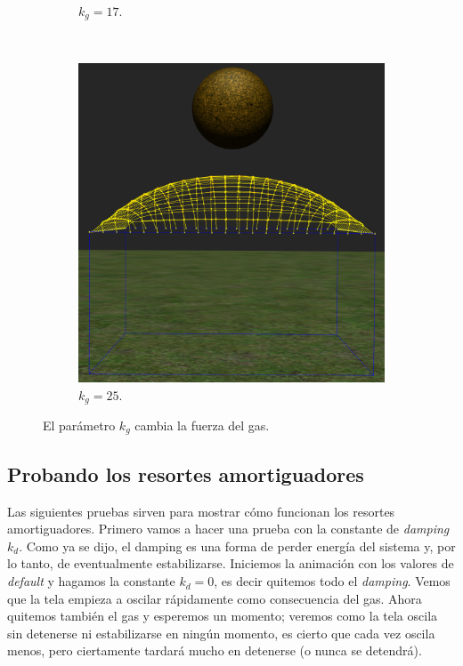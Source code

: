 \begin{figure}
\begin{subfigure}[b]{0.30\textwidth}
    \caption{$k_g=17$.}
  \end{subfigure}
~
  \begin{subfigure}[b]{0.30\textwidth}
    \includegraphics[width=\textwidth]{img/04/varPress3}
    \caption{$k_g=25$.}
  \end{subfigure}
 \caption[Experimento: Variar la fuerza del gas]{El parámetro $k_g$ cambia la fuerza del gas.} 
 \label{pres:testVar}
\end{figure}

\subsection{Probando los resortes amortiguadores}
Las siguientes pruebas sirven para mostrar cómo funcionan los resortes amortiguadores.
Primero vamos a hacer una prueba con la constante de \emph{\textenglish{damping}} $k_d$.
Como ya se dijo, el damping es una forma de perder energía del sistema y, por lo tanto, de eventualmente estabilizarse.
Iniciemos la animación con los valores de \emph{\textenglish{default}} y hagamos la constante $k_d=0$, es decir quitemos todo el \emph{\textenglish{damping}}.
Vemos que la tela empieza a oscilar rápidamente como consecuencia del gas.
Ahora quitemos también el gas y esperemos un momento; veremos como la tela oscila sin detenerse ni estabilizarse en ningún momento, es cierto que cada vez oscila menos, pero ciertamente tardará mucho en detenerse (o nunca se detendrá).

